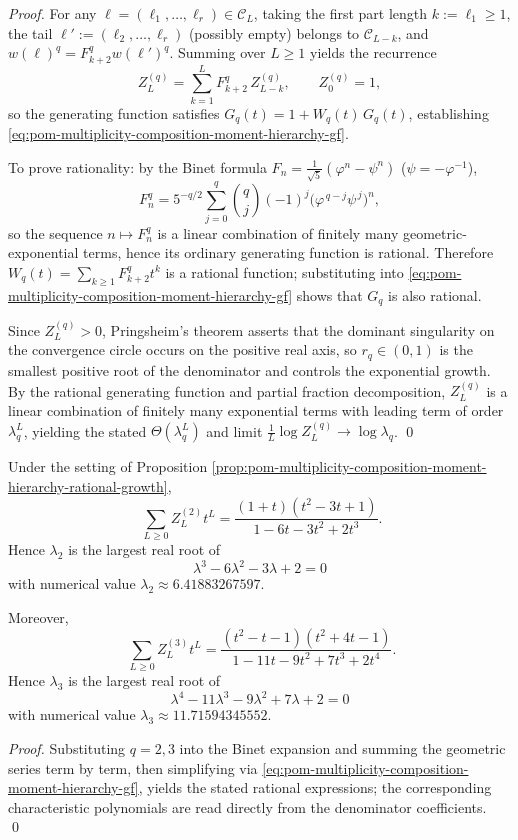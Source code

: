\begin{proof}
For any \(\boldsymbol{\ell}=(\ell_1,\dots,\ell_r)\in\mathcal{C}_L\), taking the first part length \(k:=\ell_1\ge 1\), the tail \(\boldsymbol{\ell}':=(\ell_2,\dots,\ell_r)\) (possibly empty) belongs to \(\mathcal{C}_{L-k}\), and
\(
w(\boldsymbol{\ell})^{q}=F_{k+2}^{q}w(\boldsymbol{\ell}')^{q}
\).
Summing over \(L\ge 1\) yields the recurrence
\[
Z_L^{(q)}=\sum_{k=1}^{L}F_{k+2}^{q}\,Z_{L-k}^{(q)},
\qquad Z_0^{(q)}=1,
\]
so the generating function satisfies
\(
G_q(t)=1+W_q(t)\,G_q(t)
\), establishing \eqref{eq:pom-multiplicity-composition-moment-hierarchy-gf}.
\par
To prove rationality: by the Binet formula
\(
F_n=\frac{1}{\sqrt5}(\varphi^n-\psi^n)
\) (\(\psi=-\varphi^{-1}\)),
\[
F_n^{q}=5^{-q/2}\sum_{j=0}^{q}\binom{q}{j}(-1)^j\bigl(\varphi^{\,q-j}\psi^{\,j}\bigr)^{n},
\]
so the sequence \(n\mapsto F_n^{q}\) is a linear combination of finitely many geometric-exponential terms, hence its ordinary generating function is rational.
Therefore
\(
W_q(t)=\sum_{k\ge 1}F_{k+2}^{q}t^k
\)
is a rational function; substituting into \eqref{eq:pom-multiplicity-composition-moment-hierarchy-gf} shows that \(G_q\) is also rational.
\par
Since \(Z_L^{(q)}>0\), Pringsheim's theorem asserts that the dominant singularity on the convergence circle occurs on the positive real axis, so \(r_q\in(0,1)\) is the smallest positive root of the denominator and controls the exponential growth.
By the rational generating function and partial fraction decomposition, \(Z_L^{(q)}\) is a linear combination of finitely many exponential terms with leading term of order \(\lambda_q^{L}\), yielding the stated \(\Theta(\lambda_q^L)\) and limit \(\frac1L\log Z_L^{(q)}\to\log\lambda_q\). \qed
\end{proof}

\begin{corollary}[Complete closed-form generating functions and algebraic growth constants for \texorpdfstring{$q=2,3$}{q=2,3}]\label{cor:pom-multiplicity-composition-moment-q2-q3-closed}
Under the setting of Proposition \ref{prop:pom-multiplicity-composition-moment-hierarchy-rational-growth},
\[
\boxed{\;
\sum_{L\ge 0} Z_L^{(2)}t^L=\frac{(1+t)(t^2-3t+1)}{1-6t-3t^2+2t^3}.}
\]
Hence \(\lambda_2\) is the largest real root of
\[
\boxed{\;\lambda^3-6\lambda^2-3\lambda+2=0\;}
\]
with numerical value \(\lambda_2\approx 6.41883267597\).
\par
Moreover,
\[
\boxed{\;
\sum_{L\ge 0} Z_L^{(3)}t^L=\frac{(t^2-t-1)(t^2+4t-1)}{1-11t-9t^2+7t^3+2t^4}.}
\]
Hence \(\lambda_3\) is the largest real root of
\[
\boxed{\;\lambda^4-11\lambda^3-9\lambda^2+7\lambda+2=0\;}
\]
with numerical value \(\lambda_3\approx 11.71594345552\).
\end{corollary}
\begin{proof}
Substituting \(q=2,3\) into the Binet expansion and summing the geometric series term by term, then simplifying via \eqref{eq:pom-multiplicity-composition-moment-hierarchy-gf}, yields the stated rational expressions;
the corresponding characteristic polynomials are read directly from the denominator coefficients. \qed
\end{proof}

